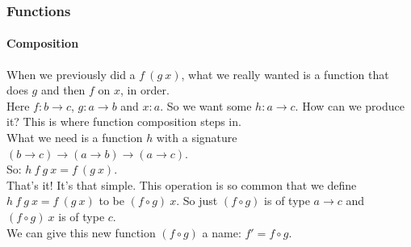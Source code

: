 \documentclass{beamer}
\begin{document}
\begin{frame}
  \frametitle{Functions}
  \framesubtitle{Composition}
  When we previously did a $f\:(g\:x)$, what we really wanted is a
  function that does $g$ and then $f$ on $x$, in order.\\
  Here $f:b \rightarrow c$, $g:a \rightarrow b$ and $x:a$.
  \pause
  So we want some $h:a \rightarrow c$. How can we produce it? This is
  where function composition steps in.\\
  \pause
  What we need is a function $h$ with a signature $(b \rightarrow c)
  \rightarrow (a \rightarrow b) \rightarrow (a \rightarrow c)$.\\
  So: $h\:f\:g\:x = f\:(g\:x)$.\\
  \pause
  That's it! It's that simple. This operation is so common that we
  define $h\:f\:g\:x = f\:(g\:x)$ to be $(f \circ g)\:x$. So just $(f
  \circ g)$ is of type $a \rightarrow c$ and $(f \circ g)\:x$ is of
  type $c$.\\
  \pause
  We can give this new function $(f \circ g)$ a name: $f' = f \circ g$.
\end{frame}
\end{document}
